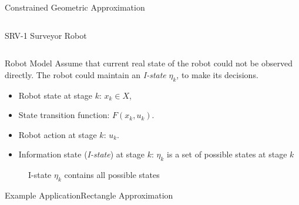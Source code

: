 \begin{frame}{Constrained Geometric Approximation}
\begin{columns}
\begin{column}{.35\textwidth}
\begin{figure}
    \end{figure}
    SRV-1 Surveyor Robot
  \end{column}
\end{columns}
\end{frame}

\begin{frame}{Robot Model}
Assume that current real state of the robot could not be observed directly.  The
robot could maintain an \emph{I-state} $\eta_k$, to make its decisions.
\begin{itemize}
\item Robot state at stage $k$: $x_k \in X$,
\item State transition function: $F(x_k, u_k)$.
\item Robot action at stage $k$: $u_k$.
\item Information state (\emph{I-state}) at stage $k$: $\eta_k$ is a set of
  possible states at stage $k$
\end{itemize}
\begin{figure}
  \caption{I-state $\eta_k$ contains all possible states}
  \label{fig:istate}
\end{figure}
\end{frame}

\begin{frame}{Example Application}{Rectangle Approximation}
  \begin{center}
  \end{center}
\end{frame}


